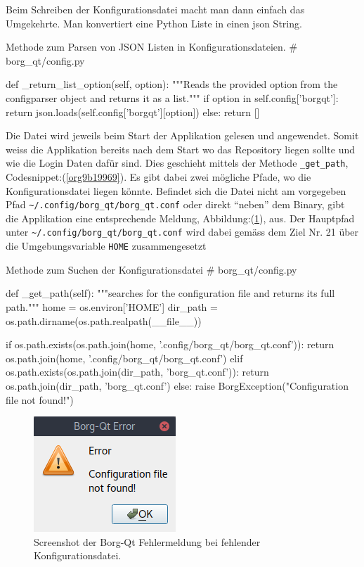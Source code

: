 Beim Schreiben der Konfigurationsdatei macht man dann einfach das Umgekehrte.
Man konvertiert eine Python Liste in einen \gls{json} String.

\begin{sexylisting}{Methode zum Parsen von JSON Listen in Konfigurationsdateien.}
# borg_qt/config.py

def _return_list_option(self, option):
    """Reads the provided option from the configparser object and returns
    it as a list."""
    if option in self.config['borgqt']:
        return json.loads(self.config['borgqt'][option])
    else:
        return []
\end{sexylisting}

Die Datei wird jeweils beim Start der Applikation gelesen und angewendet. Somit
weiss die Applikation bereits nach dem Start wo das Repository liegen sollte
und wie die Login Daten dafür sind. Dies geschieht mittels der Methode
\texttt{\_get\_path}, Codesnippet:(\ref{org9b19969}). Es gibt dabei zwei mögliche Pfade,
wo die Konfigurationsdatei liegen könnte. Befindet sich die Datei nicht am
vorgegeben Pfad \texttt{\textasciitilde{}/.config/borg\_qt/borg\_qt.conf} oder direkt "`neben"' dem
Binary, gibt die Applikation eine entsprechende Meldung,
Abbildung:(\ref{fig:orgb4e2c3c}), aus. Der Hauptpfad unter
\texttt{\textasciitilde{}/.config/borg\_qt/borg\_qt.conf} wird dabei gemäss dem Ziel Nr. 21 über die
Umgebungsvariable \texttt{HOME} zusammengesetzt

\begin{sexylisting}{Methode zum Suchen der Konfigurationsdatei}
# borg_qt/config.py

def _get_path(self):
    """searches for the configuration file and returns its full path."""
    home = os.environ['HOME']
    dir_path = os.path.dirname(os.path.realpath(__file__))

    if os.path.exists(os.path.join(home, '.config/borg_qt/borg_qt.conf')):
        return os.path.join(home, '.config/borg_qt/borg_qt.conf')
    elif os.path.exists(os.path.join(dir_path, 'borg_qt.conf')):
        return os.path.join(dir_path, 'borg_qt.conf')
    else:
        raise BorgException("Configuration file not found!")
\end{sexylisting}

\begin{figure}[H]
\centering
\includegraphics[width=.3\textwidth]{pictures/borgqt_missing_config.png}
\caption{\label{fig:orgb4e2c3c}
Screenshot der Borg-Qt Fehlermeldung bei fehlender Konfigurationsdatei.}
\end{figure}

